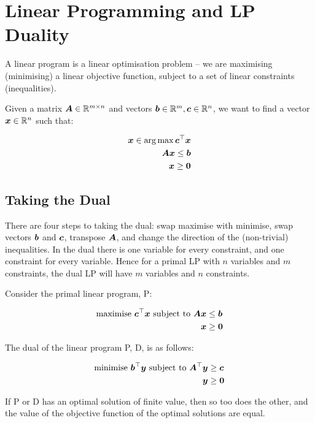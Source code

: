 \section{Linear Programming and LP Duality}

A linear program is a linear optimisation problem -- we are maximising
(minimising) a linear objective function, subject to a set of linear
constraints (inequalities).

\begin{definition}
	Given a matrix $\bm{A} \in \mathbb{R}^{m \times n}$ and vectors $\bm{b}
	\in \mathbb{R}^m, \bm{c} \in \mathbb{R}^n$, we want to find a vector
	$\bm{x} \in \mathbb{R}^n$ such that:

	\begin{equation}
		\begin{split}
			\bm{x} \in \operatorname*{arg\,max} \bm{c}^\top \bm{x} \\
			\bm{A}\bm{x} \le \bm{b} \\
			\bm{x} \ge \bm{0}
		\end{split}
	\end{equation}
\end{definition}

\subsection{Taking the Dual}

There are four steps to taking the dual: swap maximise with minimise, swap
vectors $\bm{b}$ and $\bm{c}$, transpose $\bm{A}$, and change the
direction of the (non-trivial) inequalities. In the dual there is one variable
for every constraint, and one constraint for every variable. Hence for a primal
LP with $n$ variables and $m$ constraints, the dual LP will have $m$ variables
and $n$ constraints.

Consider the primal linear program, P:

\begin{equation}
	\begin{split}
		\text{maximise } \bm{c}^\top \bm{x} \text{ subject to }
		\bm{A}\bm{x} & \le \bm{b} \\
		\bm{x} & \ge \bm{0}
	\end{split}
\end{equation}

The dual of the linear program P, D, is as follows:

\begin{equation}
	\begin{split}
		\text{minimise } \bm{b}^\top \bm{y} \text{ subject to }
		\bm{A}^\top \bm{y} & \ge \bm{c} \\
		\bm{y} & \ge \bm{0}
	\end{split}
\end{equation}

\begin{theorem}
	If P or D has an optimal solution of finite value, then so too does the
	other, and the value of the objective function of the optimal solutions are
	equal.
\end{theorem}

